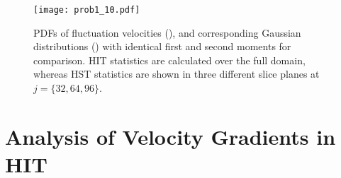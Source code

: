 \documentclass[11pt]{article}
\begin{document}
\begin{figure}[t]
\centering
\texttt{[image: prob1\_10.pdf]}
\\[6pt]
\caption{PDFs of fluctuation velocities (), and corresponding Gaussian distributions () with identical first and second moments for comparison. HIT statistics are calculated over the full domain, whereas HST statistics are shown in three different slice planes at $j = \{32,64,96\}$.}
\label{fig:prob_1_10_fluctuation_pdfs}
\end{figure}

\section{Analysis of Velocity Gradients in HIT}

\subsection{}

\subsection{}

\subsection{}

\subsection{}

\subsection{}

\subsection{}

\subsection{}

\subsection{}

\subsection{}
\end{document}
